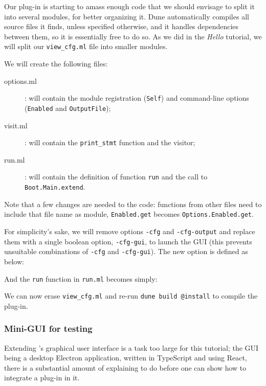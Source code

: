 Our plug-in is starting to amass enough code that we should envisage to split
it into several modules, for better organizing it. Dune automatically compiles
all source files it finds, unless specified otherwise, and it handles
dependencies between them, so it is essentially free to do so. As we did in the
{\em Hello} tutorial, we will split our \verb|view_cfg.ml| file into smaller
modules.

We will create the following files:

\begin{description}
\item[options.ml]: will contain the module registration (\verb|Self|) and
  command-line options (\verb|Enabled| and \verb|OutputFile|);
\item[visit.ml]: will contain the \verb|print_stmt| function and the visitor;
\item[run.ml]: will contain the definition of function \verb|run| and the
  call to \verb|Boot.Main.extend|.
\end{description}

Note that a few changes are needed to the code: functions from other files
need to include that file name as module, \eg
\verb|Enabled.get| becomes \verb|Options.Enabled.get|.

For simplicity's sake, we will remove options \verb|-cfg| and \verb|-cfg-output|
and replace them with a single boolean option, \verb|-cfg-gui|, to launch the
GUI (this prevents unsuitable combinations of \verb|-cfg| and \verb|-cfg-gui|).
The new option is defined as below:


And the \verb|run| function in \verb|run.ml| becomes simply:


We can now erase \verb|view_cfg.ml| and re-run \verb|dune build @install| to
compile the plug-in.

\subsubsection{Mini-GUI for testing}

Extending \framac's graphical user interface is a task too large for
this tutorial; the GUI being a desktop Electron application, written in
TypeScript and using React, there is a substantial amount of explaining to
do before one can show how to integrate a \framac plug-in in it.

